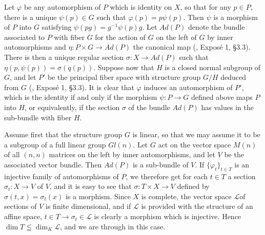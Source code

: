 Let $\varphi$ be any automorphism of $P$ which is identity on $X$, so that for any $p\in P$, there is a unique $\psi (p) \in G$ such that $\varphi (p) = p \psi (p)$. Then $\psi$ is a morphism of $P$ into $G$ satisfying $\psi (pg) = g^{-1} \psi (p)g$. Let $Ad (P)$ denote the bundle associated to $P$ with fiber $G$ for the action of $G$ on the left of $G$ by inner automorphisms and $\eta: P \times G \to Ad (P)$ the canonical map (\cite{art6-key6}, Expos\'e 1, \S 3.3). There is then a unique regular section $\sigma : X \to Ad (P)$ such that $\eta(p, \psi (p)) = \sigma (q (p))$. Suppose now that $H$ is a closed normal subgroup of $G$, and let $P'$ be the principal fiber space with structure group $G/H$ deduced from $G$ (\cite{art6-key6}, Expos\'e 1, \S 3.3). It is clear that $\varphi$ induces an automorphism of $P'$, which is the identity if and only if the morphism $\psi: P \to G$ defined above maps $P$ into $H$, or equivalently, if the section $\sigma$ of the bundle $Ad (P)$ has values in the sub-bundle with fiber $H$.

Assume first that the structure group $G$ is linear, so that we may assume it to be a subgroup of a full linear group $Gl(n)$. Let $G$ act on the vector space $M(n)$ of all $(n,n)$ matrices on the left by inner automorphisms, and let $V$ be the associated vector bundle. Then $A d(P)$ is a sub-bundle of $V$. If $\{\varphi_t\}_{t \in T}$ is an injective family of automorphisms of $P$, we therefore get for each $t \in T$ a section $\sigma_t : X \to V$ of $V$, and it is easy to see that $\sigma : T \times X \to V$ defined by $\sigma (t, x) = \sigma_t (x)$ is a morphism. Since $X$ is complete, the vector space $\mathscr{L}$of sections of $V$ is finite dimensional, and if $\mathscr{L}$ is provided with the structure of an affine space, $t \in T \to \sigma_t \in \mathscr{L}$ is clearly a morphism which is injective. Hence $\dim T \leqq \dim_K \mathscr{L}$, and we are through in this case.

